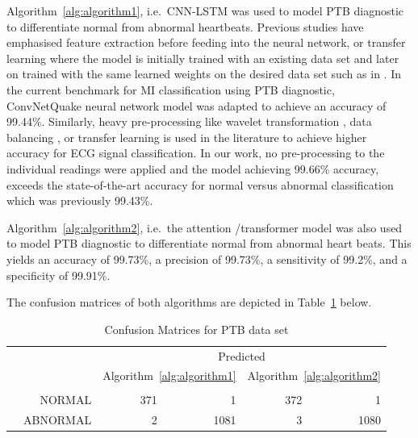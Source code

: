 \documentclass{ieeeaccess}
\begin{document}
Algorithm~\ref{alg:algorithm1}, i.e.\ CNN-LSTM was used to model PTB diagnostic to differentiate normal from abnormal heartbeats. Previous studies have emphasised feature extraction before feeding into the neural network, or transfer learning where the model is initially trained with an existing data set and later on trained with the same learned weights on the desired data set such as in \cite{9630333}. In the current benchmark for MI classification using PTB diagnostic, ConvNetQuake neural network model was adapted to achieve an accuracy of 99.44\%. Similarly, heavy pre-processing like wavelet transformation \cite{ACHARYA2017190}, data balancing \cite{latest},  or transfer learning \cite{8419425} is used in the literature to achieve higher accuracy for ECG signal classification. In our work, no pre-processing to the individual readings were applied and the model achieving 99.66\% accuracy, exceeds the state-of-the-art accuracy for normal versus abnormal classification which was previously 99.43\%. 

Algorithm~\ref{alg:algorithm2}, i.e.\ the attention /transformer model was also used to model PTB diagnostic to differentiate normal from abnormal heart beats. This yields an accuracy of 99.73\%, a precision of 99.73\%, a sensitivity of 99.2\%, and a specificity of 99.91\%.

The confusion matrices of both algorithms are depicted in Table~\ref{tbl:ConfusionMatrixPTB} below. %

\begin{table}[!ht]
	\caption{Confusion Matrices for PTB data set}
	\label{tbl:ConfusionMatrixPTB}
\centering
\scriptsize
{%
	\renewcommand{\arraystretch}{1.5}
	\begin{tabular}{cr|r r | r r}
		\multicolumn{2}{c}{}
		&   \multicolumn{4}{c}{Predicted}\\
		\multicolumn{2}{c|}{}
		&   \multicolumn{2}{c|}{Algorithm~\ref{alg:algorithm1}} &   \multicolumn{2}{c}{Algorithm~\ref{alg:algorithm2}}\\
		\cline{3-6}
		&	&\multicolumn{1}{c}{\rotatebox{90}{NORMAL}} &\multicolumn{1}{c|}{\rotatebox{90}{ABNORMAL }}&\multicolumn{1}{c}{\rotatebox{90}{NORMAL}} &\multicolumn{1}{c}{\rotatebox{90}{ABNORMAL }}\\
		\cline{2-6}
		\multirow{2}{*}{\rotatebox[origin=c]{90}{Actual}}
		& NORMAL 	&371	&1		&372	&1	\\	
		& ABNORMAL 	&2	    &1081	&3		&1080\\ 
	\end{tabular}
}
\end{table}
\end{document}
